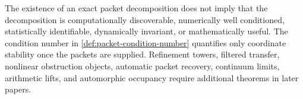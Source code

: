 \begin{boundary}
\label{bnd:final-claim-boundary}
The existence of an exact packet decomposition does not imply that the decomposition is computationally discoverable, numerically well conditioned, statistically identifiable, dynamically invariant, or mathematically useful.  The condition number in \cref{def:packet-condition-number} quantifies only coordinate stability once the packets are supplied.  Refinement towers, filtered transfer, nonlinear obstruction objects, automatic packet recovery, continuum limits, arithmetic lifts, and automorphic occupancy require additional theorems in later papers.
\end{boundary}



